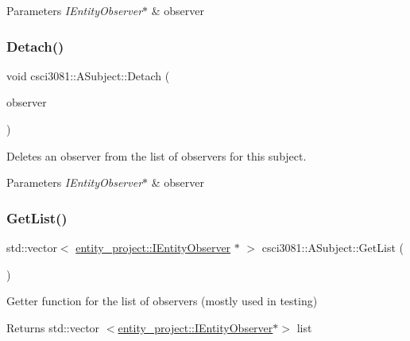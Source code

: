 \begin{DoxyParams}{Parameters}
{\em I\+Entity\+Observer$\ast$} & observer \\
\hline
\end{DoxyParams}
\mbox{\label{classcsci3081_1_1ASubject_ae077b42d8551ecf10c587250a6c46cc2}} 
\subsubsection{\texorpdfstring{Detach()}{Detach()}}
{\footnotesize\ttfamily void csci3081\+::\+A\+Subject\+::\+Detach (\begin{DoxyParamCaption}\item[{\hyperlink{classentity__project_1_1IEntityObserver}{entity\+\_\+project\+::\+I\+Entity\+Observer} $\ast$}]{observer }\end{DoxyParamCaption})}



Deletes an observer from the list of observers for this subject. 


\begin{DoxyParams}{Parameters}
{\em I\+Entity\+Observer$\ast$} & observer \\
\hline
\end{DoxyParams}
\mbox{\label{classcsci3081_1_1ASubject_aaa18e3aab659fe04b75dd6cba8efd4fa}} 
\subsubsection{\texorpdfstring{Get\+List()}{GetList()}}
{\footnotesize\ttfamily std\+::vector$<$ \hyperlink{classentity__project_1_1IEntityObserver}{entity\+\_\+project\+::\+I\+Entity\+Observer} $\ast$ $>$ csci3081\+::\+A\+Subject\+::\+Get\+List (\begin{DoxyParamCaption}{ }\end{DoxyParamCaption})}



Getter function for the list of observers (mostly used in testing) 

\begin{DoxyReturn}{Returns}
std\+::vector $<$\hyperlink{classentity__project_1_1IEntityObserver}{entity\+\_\+project\+::\+I\+Entity\+Observer}$\ast$$>$ list 
\end{DoxyReturn}
\mbox{\label{classcsci3081_1_1ASubject_a206a9ddb559da279011e2f9ea29663dc}} 
